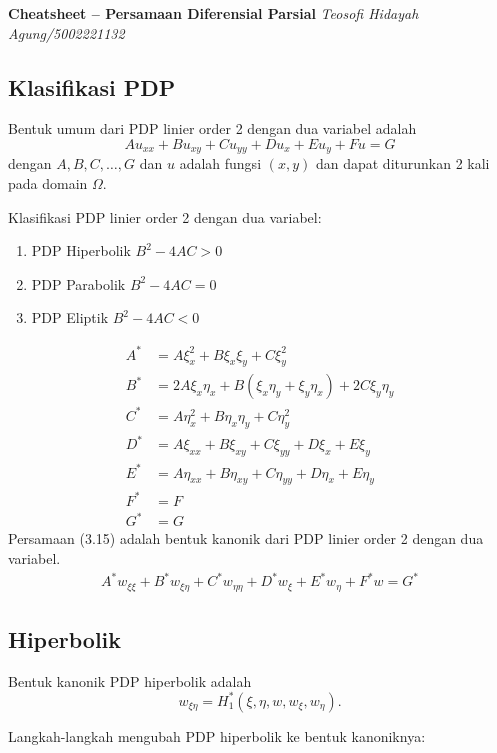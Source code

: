\documentclass[a4paper,extrafontsizes, 9pt]{memoir}
\begin{document}
\footnotesize \textbf{{Cheatsheet -- Persamaan Diferensial Parsial}} \hfill \textit{Teosofi Hidayah Agung/5002221132}
	\begin{multicols}{3}			
        \subsection*{\small Klasifikasi PDP}
            Bentuk umum dari PDP linier order 2 dengan dua variabel adalah
\begin{equation*}
Au_{xx} + Bu_{xy} + Cu_{yy} + Du_x + Eu_y + Fu = G
\end{equation*}
dengan $A, B, C, \ldots, G$ dan $u$ adalah fungsi $(x, y)$ dan dapat diturunkan 2 kali pada domain $\Omega$.

Klasifikasi PDP linier order 2 dengan dua variabel:
\begin{enumerate}
    \item PDP Hiperbolik \hfill $B^2 - 4AC > 0$
    \item PDP Parabolik \hfill $B^2 - 4AC = 0$
    \item PDP Eliptik \hfill $B^2 - 4AC < 0$
\end{enumerate}
\begin{align*}
A^* &= A \xi_x^2 + B \xi_x \xi_y + C \xi_y^2 \\
B^* &= 2A \xi_x \eta_x + B \left( \xi_x \eta_y + \xi_y \eta_x \right) + 2C \xi_y \eta_y \\
C^* &= A \eta_x^2 + B \eta_x \eta_y + C \eta_y^2 \\
D^* &= A \xi_{xx} + B \xi_{xy} + C \xi_{yy} + D \xi_x + E \xi_y \\
E^* &= A \eta_{xx} + B \eta_{xy} + C \eta_{yy} + D \eta_x + E \eta_y \\
F^* &= F \\
G^* &= G
\end{align*}
Persamaan (3.15) adalah bentuk kanonik dari PDP linier order 2 dengan dua variabel.
\begin{align*}
    A^*w_{\xi\xi} + B^*w_{\xi\eta} + C^*w_{\eta\eta} + D^*w_\xi + E^*w_\eta + F^*w = G^*
\end{align*}
            \subsection*{\small Hiperbolik}
                Bentuk kanonik PDP hiperbolik adalah
\[
w_{\xi \eta} = H^*_1(\xi, \eta, w, w_\xi, w_\eta).
\]

Langkah-langkah mengubah PDP hiperbolik ke bentuk kanoniknya:


\end{multicols}
\end{document}
